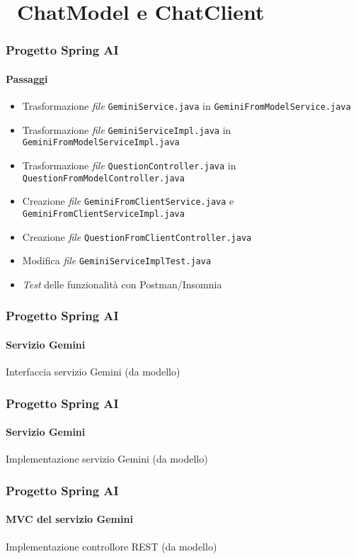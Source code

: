 \section{\faWrench\ ChatModel e ChatClient} %
\label{sec:spring-ai-gemini-chatmodel-vs-chatclient}
%
\begin{frame}[t,fragile] \frametitle{Progetto Spring AI}
    \framesubtitle{Passaggi}
	\begin{itemize}[leftmargin=10pt,align=right]
		\item[\alertedcircled{1}] Trasformazione \textit{file} \texttt{GeminiService.java} in \texttt{GeminiFromModelService.java}
        \item[\alertedcircled{2}] Trasformazione \textit{file} \texttt{GeminiServiceImpl.java} in \texttt{GeminiFromModelServiceImpl.java}
        \item[\alertedcircled{3}] Trasformazione \textit{file} \texttt{QuestionController.java} in \texttt{QuestionFromModelController.java}
        \item[\alertedcircled{4}] Creazione \textit{file} \texttt{GeminiFromClientService.java} e \texttt{GeminiFromClientServiceImpl.java}
        \item[\alertedcircled{5}] Creazione \textit{file} \texttt{QuestionFromClientController.java}
        \item[\alertedcircled{6}] Modifica \textit{file} \texttt{GeminiServiceImplTest.java}
        \item[\alertedcircled{7}] \textit{Test} delle funzionalità con Postman/Insomnia
	\end{itemize}
\end{frame}
%
\begin{frame}[t,fragile] \frametitle{Progetto Spring AI}
    \framesubtitle{Servizio Gemini}
        \begin{block}{Interfaccia servizio Gemini (da modello)}
{\tiny}
    \end{block}
\end{frame}
%
\begin{frame}[t,fragile] \frametitle{Progetto Spring AI}
    \framesubtitle{Servizio Gemini}
		\vspace*{-.7cm}
        \begin{block}{Implementazione servizio Gemini (da modello)}
{\tiny}
    \end{block}
\end{frame}
%
\begin{frame}[t,fragile] \frametitle{Progetto Spring AI}
    \framesubtitle{MVC del servizio Gemini}
    	\vspace*{-.7cm}
        \begin{block}{Implementazione controllore REST (da modello)}
			{\tiny}
    	\end{block}
\end{frame}
